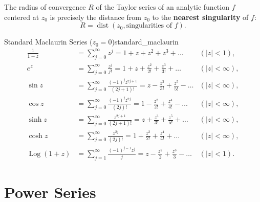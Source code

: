 \begin{remark}
The radius of convergence $R$ of the Taylor series of an analytic function $f$ centered at $z_0$ is precisely the distance from $z_0$ to the \textbf{nearest singularity} of $f$:
\begin{equation}
R = \operatorname{dist}(z_0, \text{singularities of } f).
\end{equation}
\end{remark}

\begin{proposition}{Standard Maclaurin Series ($z_0 = 0$)}{standard_maclaurin}
\begin{align}
\frac{1}{1 - z} &= \sum_{j=0}^\infty z^j = 1 + z + z^2 + z^3 + \dots & (|z| < 1), \\
e^z &= \sum_{j=0}^\infty \frac{z^j}{j!} = 1 + z + \frac{z^2}{2!} + \frac{z^3}{3!} + \dots & (|z| < \infty), \\
\sin z &= \sum_{j=0}^\infty \frac{(-1)^j z^{2j+1}}{(2j+1)!} = z - \frac{z^3}{3!} + \frac{z^5}{5!} - \dots & (|z| < \infty), \\
\cos z &= \sum_{j=0}^\infty \frac{(-1)^j z^{2j}}{(2j)!} = 1 - \frac{z^2}{2!} + \frac{z^4}{4!} - \dots & (|z| < \infty), \\
\sinh z &= \sum_{j=0}^\infty \frac{z^{2j+1}}{(2j+1)!} = z + \frac{z^3}{3!} + \frac{z^5}{5!} + \dots & (|z| < \infty), \\
\cosh z &= \sum_{j=0}^\infty \frac{z^{2j}}{(2j)!} = 1 + \frac{z^2}{2!} + \frac{z^4}{4!} + \dots & (|z| < \infty), \\
\operatorname{Log}(1 + z) &= \sum_{j=1}^\infty \frac{(-1)^{j-1} z^j}{j} = z - \frac{z^2}{2} + \frac{z^3}{3} - \dots & (|z| < 1).
\end{align}
\end{proposition}


\section{Power Series}

